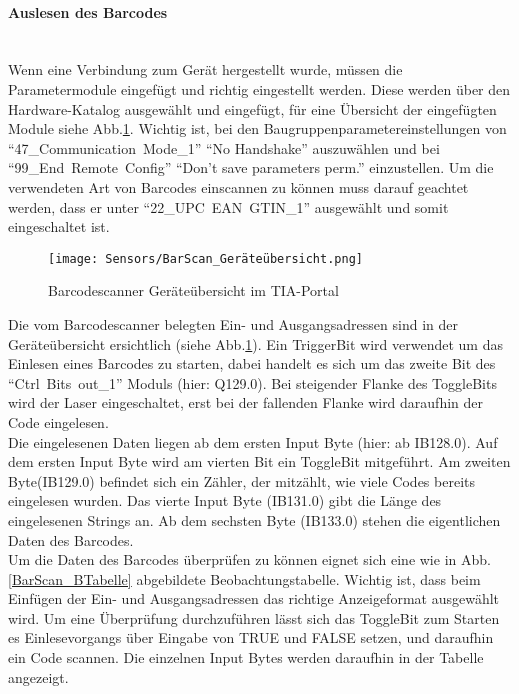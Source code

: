 \paragraph{Auslesen des Barcodes}\mbox{}\\
Wenn eine Verbindung zum Gerät hergestellt wurde, müssen die Parametermodule eingefügt und richtig eingestellt werden. Diese werden über den Hardware-Katalog ausgewählt und eingefügt, für eine Übersicht der eingefügten Module siehe Abb.\ref{BarScan_TIA}. Wichtig ist, bei den Baugruppenparametereinstellungen von \enquote{\mbox{47\_Communication Mode\_1}} \enquote{No Handshake} auszuwählen und bei \enquote{\mbox{99\_End Remote Config}}
\enquote{Don't save parameters perm.} einzustellen. Um die verwendeten Art von Barcodes einscannen zu können muss darauf geachtet werden, dass er unter \enquote{\mbox{22\_UPC EAN GTIN\_1}} ausgewählt und somit eingeschaltet ist.\\

\begin{figure}[H]
    \centering
    \texttt{[image: Sensors/BarScan\_Geräteübersicht.png]}
    \caption{Barcodescanner Geräteübersicht im TIA-Portal}
    \label{BarScan_TIA}
\end{figure}

Die vom Barcodescanner belegten Ein- und Ausgangsadressen sind in der Geräteübersicht ersichtlich (siehe Abb.\ref{BarScan_TIA}). Ein TriggerBit wird verwendet um das Einlesen eines Barcodes zu starten, dabei handelt es sich um das zweite Bit des \enquote{\mbox{Ctrl Bits out\_1}} Moduls (hier: Q129.0). Bei steigender Flanke des ToggleBits wird der Laser eingeschaltet, erst bei der fallenden Flanke wird daraufhin der Code eingelesen.\\
Die eingelesenen Daten liegen ab dem ersten Input Byte (hier: ab IB128.0). Auf dem ersten Input Byte wird am vierten Bit ein ToggleBit mitgeführt. Am zweiten Byte(IB129.0) befindet sich ein Zähler, der mitzählt, wie viele Codes bereits eingelesen wurden. Das vierte Input Byte (IB131.0) gibt die Länge des eingelesenen Strings an. Ab dem sechsten Byte (IB133.0) stehen die eigentlichen Daten des Barcodes.\\
Um die Daten des Barcodes überprüfen zu können eignet sich eine wie in Abb.\ref{BarScan_BTabelle} abgebildete Beobachtungstabelle. Wichtig ist, dass beim Einfügen der Ein- und Ausgangsadressen das richtige Anzeigeformat ausgewählt wird. Um eine Überprüfung durchzuführen lässt sich das ToggleBit zum Starten es Einlesevorgangs über Eingabe von TRUE und FALSE setzen, und daraufhin ein Code scannen. Die einzelnen Input Bytes werden daraufhin in der Tabelle angezeigt.

